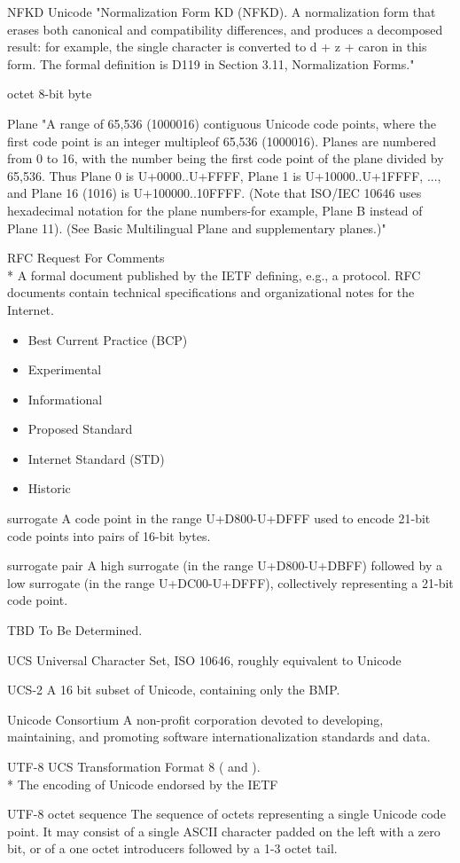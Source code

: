 \documentclass[b4paper]{article}
\begin{document}
\begin{definition}
\item [NFKD] Unicode
"Normalization Form KD (NFKD). A normalization form that erases both
canonical and compatibility differences, and produces a decomposed
result: for example, the single  character is converted to d + z +
caron in this form. The formal definition is D119 in Section 3.11,
Normalization Forms."

\item [octet] 8-bit byte
\item [Plane] "A range of 65,536 (1000016) contiguous Unicode code
points, where the first code point is an integer multipleof 65,536
(1000016). Planes are numbered from 0 to 16, with the number being the
first code point of the plane divided by 65,536. Thus Plane 0 is
U+0000..U+FFFF, Plane 1 is U+10000..U+1FFFF, ..., and Plane 16 (1016)
is U+100000..10FFFF. (Note that ISO/IEC 10646 uses hexadecimal
notation for the plane numbers-for example, Plane B instead of Plane
11). (See Basic Multilingual Plane and supplementary planes.)"
\item [RFC] Request For Comments
\\*
A formal document published by the IETF defining, e.g., a protocol.
RFC documents contain technical specifications and organizational notes for the Internet.
\begin{itemize}
  \item Best Current Practice (BCP)
  \item Experimental
  \item Informational
  \item Proposed Standard
  \item Internet Standard (STD)
  \item Historic
\end{itemize}
\item [surrogate] A code point in the range U+D800-U+DFFF used to
encode 21-bit code points into pairs of 16-bit bytes.
\item [surrogate pair] A high surrogate (in the range U+D800-U+DBFF)
followed by a low surrogate (in the range U+DC00-U+DFFF),
collectively representing a 21-bit code point.
\item [TBD] To Be Determined.
\item [UCS] Universal Character Set, ISO 10646, roughly equivalent to Unicode
\item [UCS-2] A 16 bit subset of Unicode, containing only the BMP.
\item [Unicode Consortium] A non-profit corporation devoted to
developing, maintaining, and promoting software internationalization standards and data.
\item [UTF-8] UCS Transformation Format 8
(\cite{USTD:3.9} and \cite{RFC:3629}).
\\*
The encoding of Unicode endorsed by the IETF
\item [UTF-8 octet sequence]
The sequence of octets representing a single Unicode code point.
It may consist of a single ASCII character padded on the left with a zero bit,
or of a one octet introducers followed by a 1-3 octet tail.


\end{definition}
\end{document}
